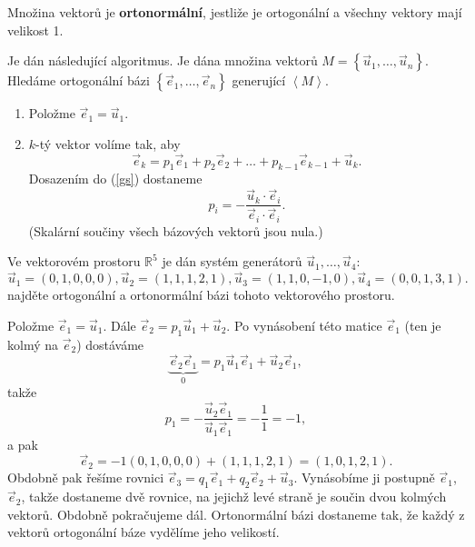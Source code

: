 \begin{definition}
    Množina vektorů je \textbf{ortonormální}, jestliže je ortogonální a všechny vektory mají
    velikost 1.
\end{definition}

\begin{veta}
    Je dán následující algoritmus.
    Je dána množina vektorů $M=\left \{ \vec u_1,\dots, \vec u_n \right \}$.\\
    Hledáme ortogonální bázi $\left \{ \vec e_1, \dots, \vec e_n \right \}$
    generující $\left < M \right >.$
    \begin{enumerate}[1.]
    \item Položme $\vec e_1 = \vec u_1.$
   	\item $k$-tý vektor volíme tak, aby
    \begin{equation}\label{gs}
    \vec e_k = p_1\vec e_1 + p_2\vec e_2 + \dots +p_{k-1} \vec e_{k-1} + \vec u_k.
    \end{equation}
    Dosazením do (\ref{gs}) dostaneme
    $$p_i = -\frac{\vec u_k\cdot \vec e_i}{\vec e_i\cdot \vec e_i}.$$
    (Skalární součiny všech bázových vektorů jsou nula.)
    \end{enumerate}
\end{veta}

\begin{priklad}
Ve vektorovém prostoru $\mathbb R^5$ je dán systém generátorů $\vec u_1,\dots,\vec u_4$:
$$
    \vec u_1 = (0,1,0,0,0), \vec u_2 = (1,1,1,2,1), \vec u_3 = (1,1,0,-1,0), \vec u_4 = (0,0,1,3,1).
$$
najděte ortogonální a ortonormální bázi tohoto vektorového prostoru.
\end{priklad}

\begin{reseni}
Položme $\vec e_1=\vec u_1.$ Dále $\vec e_2 = p_1\vec u_1 + \vec u_2$. Po vynásobení
této matice $\vec e_1$ (ten je kolmý na $\vec e_2$) dostáváme
$$\underbrace{\vec e_2 \vec e_1}_{0}=p_1\vec u_1\vec e_1+\vec u_2\vec e_1,$$
takže
$$p_1=-\frac{\vec u_2\vec e_1}{\vec u_1\vec e_1} = -\frac{1}{1}=-1,$$
a pak
$$\vec e_2 = -1(0,1,0,0,0)+(1,1,1,2,1)=(1,0,1,2,1).$$
Obdobně pak řešíme rovnici $\vec e_3=q_1\vec e_1 + q_2\vec e_2 + \vec u_3$. Vynásobíme
ji postupně $\vec e_1$, $\vec e_2$, takže dostaneme dvě rovnice, na jejichž levé straně
je součin dvou kolmých vektorů. Obdobně pokračujeme dál. Ortonormální bázi
dostaneme tak, že každý z vektorů ortogonální báze vydělíme jeho velikostí.
\end{reseni}


